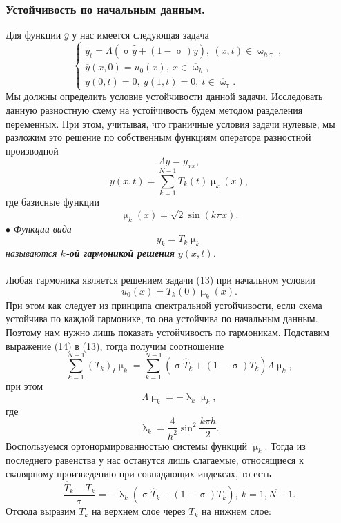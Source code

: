 \documentclass[a4paper, 12pt]{report}
\numberwithin{equation}{section}
\newcommand{\ol}{\overline}
\renewcommand{\tau}{\uptau}
\renewcommand{\lambda}{\uplambda}
\renewcommand{\sigma}{\upsigma}
\renewcommand{\mu}{\upmu}
\renewcommand{\omega}{\upomega}
\begin{document}
	\subsubsection{Устойчивость по начальным данным.}
	Для функции $\ol y$ у нас имеется следующая задача
	\begin{equation}
		\begin{cases}
			\ol y_t = \Lambda(\sigma \hat{\ol{ y}} + (1-\sigma)\ol y),\ (x,t)\in \omega_{h\tau},\\
			\ol y(x,0) = u_0(x),\ x \in \ol \omega_h,\\
			\ol y(0, t) = 0,\ \ol y(1,t) = 0,\ t \in \ol \omega_\tau.
		\end{cases}
	\end{equation}
	Мы должны определить условие устойчивости данной задачи. Исследовать данную разностную схему на устойчивость будем методом разделения переменных. При этом, учитывая, что граничные условия задачи нулевые, мы разложим это решение по собственным функциям оператора разностной производной
	$$\Lambda y = y_{\ol x x},$$
	\begin{equation}
		y(x,t) = \sum_{k=1}^{N-1}T_k(t)\mu_k(x),
	\end{equation}
	где базисные функции \begin{equation*}
		\mu_k(x) = \sqrt 2 \sin (k \pi x).
	\end{equation*}
	$\bullet$ \textit{Функции вида $$y_k = T_k \mu _k$$ называются \textbf{$k$-ой гармоникой решения} $y(x,t)$.}\\\\
	Любая гармоника является решением задачи (13) при начальном условии $$u_0(x)= T_k(0)\mu_k(x).$$
	При этом как следует из принципа спектральной устойчивости, если схема устойчива по каждой гармонике, то она устойчива по начальным данным. Поэтому нам нужно лишь показать устойчивость по гармоникам. Подставим выражение (14) в (13), тогда получим соотношение
	\begin{equation*}
		\sum_{k=1}^{N-1} (T_k)_t \mu_k = \sum_{k=1}^{N-1} (\sigma \hat T_k + (1-\sigma)T_k)\Lambda \mu_k,
	\end{equation*}
	при этом
	$$\Lambda \mu_k = -\lambda_k \mu _k,$$
	где $$\lambda_k = \dfrac{4}{h^2}\sin^2 \dfrac{k\pi h}{2}.$$
	Воспользуемся ортонормированностью системы функций $\mu_k$. Тогда из последнего равенства у нас останутся лишь слагаемые, относящиеся к скалярному произведению при совпадающих индексах, то есть
	$$\dfrac{\hat T_k - T_k}{\tau} = -\lambda_k (\sigma \hat T_k + (1-\sigma)T_k),\ k=\overline{1, N-1}.$$
	Отсюда выразим $T_k$ на верхнем слое через $T_k$ на нижнем слое:
\end{document}
